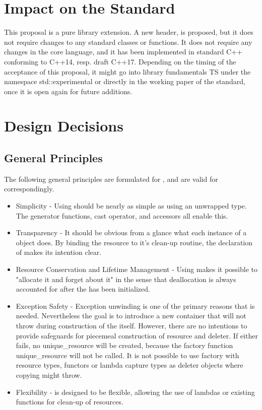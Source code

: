 \documentclass[ebook,11pt,article]{memoir}
\begin{document}
\chapter{Impact on the Standard}
This proposal is a pure library extension. A new header,  is proposed, but it does not require changes to any standard classes or functions. It does not require any changes in the core language, and it has been implemented in standard C++ conforming to C++14, resp. draft C++17. Depending on the timing of the acceptance of this proposal, it might go into library fundamentals TS under the namespace std::experimental or directly in the working paper of the standard, once it is open again for future additions.

\chapter{Design Decisions}
\section{General Principles}
The following general principles are formulated for , and are valid for  correspondingly.
\begin{itemize}
\item Simplicity - Using  should be nearly as simple as using an unwrapped type.  The generator functions, cast operator, and accessors all enable this.
\item Transparency - It should be obvious from a glance what each instance of a  object does.  By binding the resource to it's clean-up routine, the declaration of  makes its intention clear.
\item Resource Conservation and Lifetime Management - Using  makes it possible to "allocate it and forget about it" in the sense that deallocation is always accounted for after the  has been initialized.
\item Exception Safety - Exception unwinding is one of the primary reasons that  is needed.  Nevertheless the goal is to introduce a new container that will not throw during construction of the  itself. However, there are no intentions to provide safeguards for piecemeal construction of resource and deleter. If either fails, no unique_resource will be created, because the factory function unique_resource will not be called. It is not possible to use  factory with resource types, functors or lambda capture types as deleter objects where copying might throw.
\item Flexibility -  is designed to be flexible, allowing the use of lambdas or existing functions for clean-up of resources. 
\end{itemize}
\end{document}
